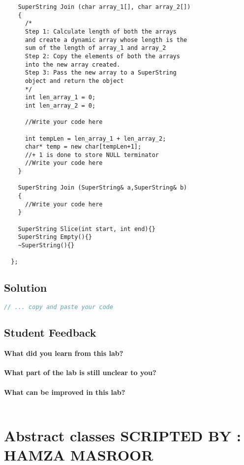 \documentclass[11pt,fleqn]{book} %
\begin{document}
\begin{lstlisting}
    SuperString Join (char array_1[], char array_2[])
    {
      /*
      Step 1: Calculate length of both the arrays
      and create a dynamic array whose length is the
      sum of the length of array_1 and array_2 
      Step 2: Copy the elements of both the arrays
      into the new array created.
      Step 3: Pass the new array to a SuperString
      object and return the object
      */
      int len_array_1 = 0;
      int len_array_2 = 0;
      
      //Write your code here
      
      int tempLen = len_array_1 + len_array_2;
      char* temp = new char[tempLen+1];
      //+ 1 is done to store NULL terminator
      //Write your code here
    }
    
    SuperString Join (SuperString& a,SuperString& b)
    {
      //Write your code here
    }
    
    SuperString Slice(int start, int end){}
    SuperString Empty(){}
    ~SuperString(){}
    
  };
\end{lstlisting}

\newpage
\section{Solution}
\begin{lstlisting}[language=C++]
  // ... copy and paste your code
\end{lstlisting}

\newpage
\section{Student Feedback}
\textbf{What did you learn from this lab?}\\
\noindent\fbox{\parbox{\textwidth}{
  }
}\\
\textbf{What part of the lab is still unclear to you?}\\
\noindent\fbox{\parbox{\textwidth}{
  }
}\\
\textbf{What can be improved in this lab?}\\ 
\noindent\fbox{\parbox{\textwidth}{
  }
}\\

\newpage

\chapter{Abstract classes \hspace{44mm} {\textsc{\small SCRIPTED BY : HAMZA MASROOR}}}
\end{document}
